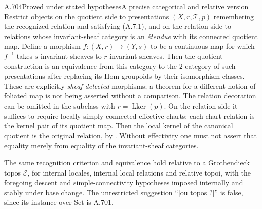 \begin{saresult}{A.704}{Proved under stated hypotheses}{A precise categorical and relative version}
Restrict objects on the quotient side to presentations $(X,r,\mathcal T,p)$
remembering the recognized relation and satisfying (A.7.1), and on the relation side to relations whose invariant-sheaf
category is an \emph{\'etendue} with its connected quotient map.
Define a morphism $f:(X,r)\to(Y,s)$ to be a continuous map for which
$f^{-1}$ takes $s$-invariant sheaves to $r$-invariant sheaves. Then
the quotient construction is an equivalence from this category to
the $2$-category of such presentations after replacing its Hom
groupoids by their isomorphism classes. These are explicitly
\emph{sheaf-detected} morphisms; a theorem for a different notion of
foliated map is not being asserted without a comparison.
The relation decoration can be omitted in the subclass with
$r=\operatorname{Lker}(p)$. On the relation side it suffices to require
locally simply connected effective charts: each chart relation is the
kernel pair of its quotient map. Then the local kernel of the canonical
quotient is the original relation, by \cite[Remark 6.5]{KockMoerdijk1992}.
Without effectivity one must not assert that equality merely from
equality of the invariant-sheaf categories.

The same recognition criterion and equivalence hold relative to a
Grothendieck topos $\mathcal E$, for internal locales, internal local
relations and relative topoi, with the foregoing descent and
simple-connectivity hypotheses imposed internally and stably under
base change. The unrestricted suggestion ``[ou topos ?]'' is false,
since its instance over $\mathrm{Set}$ is A.701.
\end{saresult}
